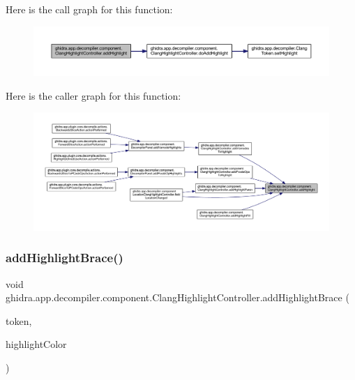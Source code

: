 Here is the call graph for this function\+:
\nopagebreak
\begin{figure}[H]
\begin{center}
\leavevmode
\includegraphics[width=350pt]{classghidra_1_1app_1_1decompiler_1_1component_1_1_clang_highlight_controller_a8a3fd199e6bb9bf1533edbeedfadc614_cgraph}
\end{center}
\end{figure}
Here is the caller graph for this function\+:
\nopagebreak
\begin{figure}[H]
\begin{center}
\leavevmode
\includegraphics[width=350pt]{classghidra_1_1app_1_1decompiler_1_1component_1_1_clang_highlight_controller_a8a3fd199e6bb9bf1533edbeedfadc614_icgraph}
\end{center}
\end{figure}
\mbox{\label{classghidra_1_1app_1_1decompiler_1_1component_1_1_clang_highlight_controller_a5e8c11782f11a49ec54b398220970c06}} 
\subsubsection{\texorpdfstring{addHighlightBrace()}{addHighlightBrace()}}
{\footnotesize\ttfamily void ghidra.\+app.\+decompiler.\+component.\+Clang\+Highlight\+Controller.\+add\+Highlight\+Brace (\begin{DoxyParamCaption}\item[{\mbox{\hyperlink{classghidra_1_1app_1_1decompiler_1_1_clang_syntax_token}{Clang\+Syntax\+Token}}}]{token,  }\item[{Color}]{highlight\+Color }\end{DoxyParamCaption})\hspace{0.3cm}{\ttfamily [inline]}}




